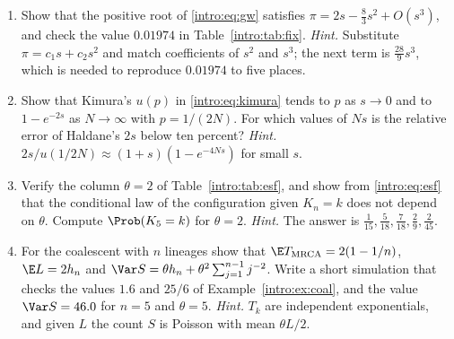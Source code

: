\begin{enumerate}[label=\arabic*.,ref=\arabic*,leftmargin=*]
\item\label{intro:exr:gw} Show that the positive root of \eqref{intro:eq:gw} satisfies
$\pi=2s-\tfrac83s^2+O(s^3)$, and check the value $0.01974$ in Table~\ref{intro:tab:fix}.
\emph{Hint.} Substitute $\pi=c_1s+c_2s^2$ and match coefficients of $s^2$ and $s^3$; the next term is $\tfrac{28}{9}s^3$, which is needed to reproduce $0.01974$ to five places.

\item Show that Kimura's $u(p)$ in \eqref{intro:eq:kimura} tends to $p$ as $s\to0$ and to
$1-e^{-2s}$ as $N\to\infty$ with $p=1/(2N)$. For which values of $Ns$ is the relative error of
Haldane's $2s$ below ten percent? \emph{Hint.} $2s/u(1/2N)\approx(1+s)(1-e^{-4Ns})$ for small $s$.

\item Verify the column $\theta=2$ of Table~\ref{intro:tab:esf}, and show from
\eqref{intro:eq:esf} that the conditional law of the configuration given $K_n=k$ does not depend
on $\theta$. Compute $\Prob(K_5=k)$ for $\theta=2$. \emph{Hint.} The answer is
$\tfrac1{15},\tfrac5{18},\tfrac7{18},\tfrac29,\tfrac2{45}$.

\item For the coalescent with $n$ lineages show that $\E T_{\mathrm{MRCA}}=2(1-1/n)$,
$\E L=2h_n$ and $\Var S=\theta h_n+\theta^2\sum_{j=1}^{n-1}j^{-2}$. Write a short simulation that
checks the values $1.6$ and $25/6$ of Example~\ref{intro:ex:coal}, and the value
$\Var S=46.0$ for $n=5$ and $\theta=5$. \emph{Hint.} $T_k$ are independent exponentials, and given
$L$ the count $S$ is Poisson with mean $\theta L/2$.

\end{enumerate}

